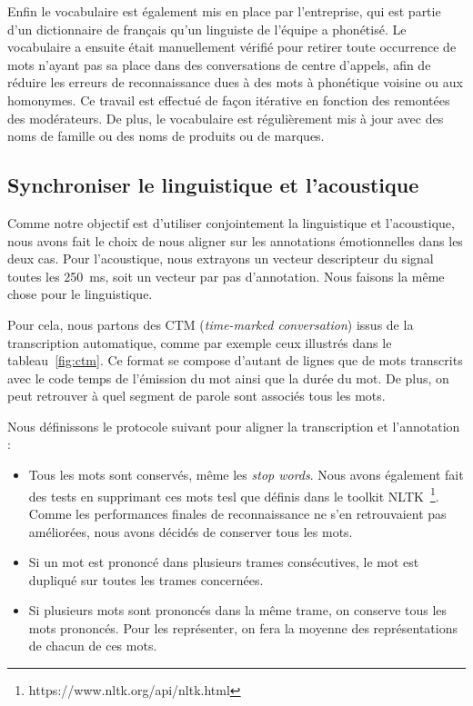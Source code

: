 Enfin le vocabulaire est également mis en place par l'entreprise, qui est partie d'un dictionnaire de français qu'un linguiste de l'équipe a phonétisé. Le vocabulaire a ensuite était manuellement vérifié pour retirer toute occurrence de mots n'ayant pas sa place dans des conversations de centre d'appels, afin de réduire les erreurs de reconnaissance dues à des mots à phonétique voisine ou aux homonymes. Ce travail est effectué de façon itérative en fonction des remontées des modérateurs. De plus, le vocabulaire est régulièrement mis à jour avec des noms de famille ou des noms de produits ou de marques.

\subsection{Synchroniser le linguistique et l'acoustique}
Comme notre objectif est d'utiliser conjointement la linguistique et l'acoustique, nous avons fait le choix de nous aligner sur les annotations émotionnelles dans les deux cas. Pour l'acoustique, nous extrayons un vecteur descripteur du signal toutes les 250~ms, soit un vecteur par pas d'annotation. Nous faisons la même chose pour le linguistique.

Pour cela, nous partons des CTM (\textit{time-marked conversation}) issus de la transcription automatique, comme par exemple ceux illustrés dans le tableau~\ref{fig:ctm}. Ce format se compose d'autant de lignes que de mots transcrits avec le code temps de l'émission du mot ainsi que la durée du mot. De plus, on peut retrouver à quel segment de parole sont associés tous les mots.




Nous définissons le protocole suivant pour aligner la transcription et l'annotation :
\begin{itemize}
  \item Tous les mots sont conservés, même les \textit{stop words}. Nous avons également fait des tests en supprimant ces mots tesl que définis dans le toolkit NLTK~\footnote{https://www.nltk.org/api/nltk.html}. Comme les performances finales de reconnaissance ne s'en retrouvaient pas améliorées, nous avons décidés de conserver tous les mots.
  \item Si un mot est prononcé dans plusieurs trames consécutives, le mot est dupliqué sur toutes les trames concernées.
  \item Si plusieurs mots sont prononcés dans la même trame, on conserve tous les mots prononcés. Pour les représenter, on fera la moyenne des représentations de chacun de ces mots.
\end{itemize}

